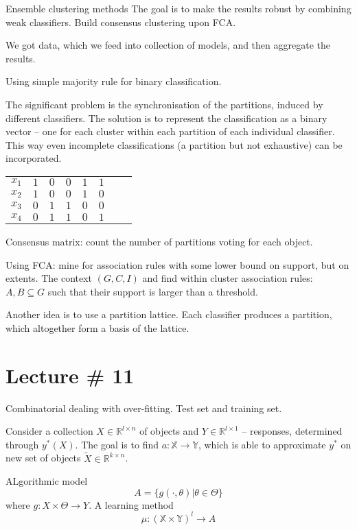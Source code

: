 \documentclass[a4paper]{article}
\newcommand{\Real}{\mathbb{R}}
\begin{document}
Ensemble clustering methods
The goal is to make the results robust by combining weak classifiers.
Build consensus clustering upon FCA.

We got data, which we feed into collection of models, and then aggregate the results.

Using simple majority rule for binary classification.

The significant problem is the synchronisation of the partitions, induced by different classifiers.
The solution is to represent the classification as a binary vector -- one for each cluster within 
each partition of each individual classifier. This way even incomplete classifications (a partition
but not exhaustive) can be incorporated.
\begin{tabular}{c|c|c||c|c|c||c|c|}
$x_1$ & $1$ & $0$ & $0$ & $1$ & $1$ \\
$x_2$ & $1$ & $0$ & $0$ & $1$ & $0$ \\
$x_3$ & $0$ & $1$ & $1$ & $0$ & $0$ \\
$x_4$ & $0$ & $1$ & $1$ & $0$ & $1$
\end{tabular}

Consensus matrix: count the number of partitions voting for each object.

Using FCA: mine for association rules with some lower bound on support, but on extents.
The context $(G,C,I)$ and find within cluster association rules: $A,B\subseteq G$ such
that their support is larger than a threshold.

Another idea is to use a partition lattice. Each classifier produces a partition, which
altogether form a basis of the lattice. 


\section{Lecture \# 11} %
\label{sec:lecture_11}

Combinatorial dealing with over-fitting. Test set and training set. 

Consider a collection $X\in \Real^{l\times n}$ of objects and $Y\in \Real^{l\times 1}$
-- responses, determined through $y^*(X)$. The goal is to find $a:\mathbb{X}\to \mathbb{Y}$, which
is able to approximate $y^*$ on new set of objects $\tilde{X}\in \Real^{k\times n}$.

ALgorithmic model
\[A = \bigl\{g(\cdot, \theta)\rvert \theta\in \Theta\bigr\}\]
where $g:X\times \Theta\to Y$.
A learning method
\[\mu:(\mathbb{X}\times \mathbb{Y})^l\to A\]
\end{document}

